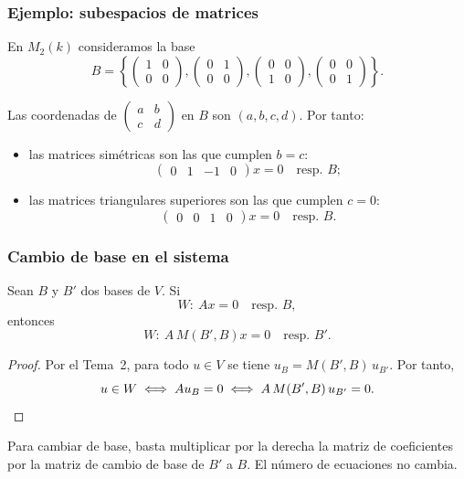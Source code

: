 \begin{frame}
    \frametitle{Ejemplo: subespacios de matrices}

    \begin{example}
        En $M_2(k)$ consideramos la base
        \[
            B=\left\{
            \begin{pmatrix}1&0\\0&0\end{pmatrix},
            \begin{pmatrix}0&1\\0&0\end{pmatrix},
            \begin{pmatrix}0&0\\1&0\end{pmatrix},
            \begin{pmatrix}0&0\\0&1\end{pmatrix}
            \right\}.
        \]
    \end{example}

    Las coordenadas de $\begin{pmatrix}a&b\\c&d\end{pmatrix}$ en $B$ son
    $(a,b,c,d)$. Por tanto:
    \begin{itemize}
        \item las matrices \alert{simétricas} son las que cumplen $b=c$:
        \[
            \begin{pmatrix}0&1&-1&0\end{pmatrix}x=0\quad\text{resp.\ }B;
        \]
        \item las matrices \alert{triangulares superiores} son las que
        cumplen $c=0$:
        \[
            \begin{pmatrix}0&0&1&0\end{pmatrix}x=0\quad\text{resp.\ }B.
        \]
    \end{itemize}
\end{frame}

\begin{frame}
    \frametitle{Cambio de base en el sistema}

    \begin{proposition}
        Sean $B$ y $B'$ dos bases de $V$. Si
        \[
            W\colon\ Ax=0\quad\text{resp.\ }B,
        \]
        entonces
        \[
            W\colon\ A\,M(B',B)x=0\quad\text{resp.\ }B'.
        \]
    \end{proposition}

    \vspace{-10pt}

    \begin{proof}
        Por el Tema~2, para todo $u\in V$ se tiene $u_B=M(B',B)\,u_{B'}$.
        Por tanto,
        \[
            u\in W
            \iff Au_B=0
            \iff A\,M(B',B)\,u_{B'}=0.\qedhere
        \]
    \end{proof}

    Para cambiar de base, basta \alert{multiplicar por la derecha} la matriz
    de coeficientes por la matriz de cambio de base de $B'$ a $B$.
    El número de ecuaciones no cambia.
\end{frame}

